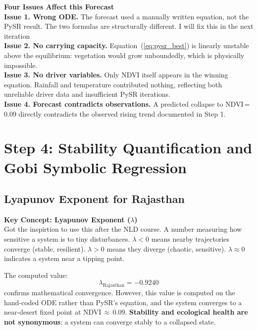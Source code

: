 \documentclass[12pt, a4paper]{article}
\begin{document}
\begin{mdframed}[style=warnbox]
\textbf{\textcolor{warnred}{Four Issues Affect this Forecast}}\\[6pt]
\textbf{Issue 1. Wrong ODE.} The forecast used a manually written equation,
not the PySR result. The two formulas are structurally different. I will fix this in the next iteration\\[4pt]
\textbf{Issue 2. No carrying capacity.} Equation~(\ref{eq:pysr_best}) is
linearly unstable above the equilibrium: vegetation would grow unboundedly,
which is physically impossible.\\[4pt]
\textbf{Issue 3. No driver variables.} Only NDVI itself appears in the
winning equation. Rainfall and temperature contributed nothing, reflecting
both unreliable driver data and insufficient PySR iterations.\\[4pt]
\textbf{Issue 4. Forecast contradicts observations.} A predicted collapse
to NDVI\,=\,0.09 directly contradicts the observed rising trend documented
in Step 1.
\end{mdframed}

\section{Step 4: Stability Quantification and Gobi Symbolic Regression}

\subsection{Lyapunov Exponent for Rajasthan}

\begin{mdframed}[style=keybox]
\textbf{Key Concept: Lyapunov Exponent ($\lambda$)}\\[4pt]
Got the inspirtion to use this after the NLD course.
A number measuring how sensitive a system is to tiny disturbances.
$\lambda < 0$ means nearby trajectories converge (stable, resilient).
$\lambda > 0$ means they diverge (chaotic, sensitive).
$\lambda \approx 0$ indicates a system near a tipping point.
\end{mdframed}

The computed value:
\begin{equation}
    \lambda_{\text{Rajasthan}} = -0.9240
    \label{eq:lyapunov}
\end{equation}
confirms mathematical convergence. However, this value is computed on
the hand-coded ODE rather than PySR's equation, and the system converges
to a near-desert fixed point at NDVI\,$\approx$\,0.09.
\textbf{Stability and ecological health are not synonymous}: a system can
converge stably to a collapsed state.
\end{document}
